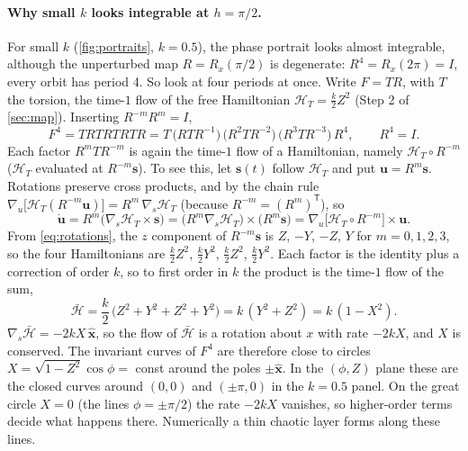 \documentclass[11pt,a4paper]{article}
\newcommand{\vs}{\bm{s}}
\begin{document}
\paragraph{Why small $k$ looks integrable at $h = \pi/2$.} For small $k$ (\cref{fig:portraits}, $k=0.5$), the phase
portrait looks almost integrable, although the unperturbed map $R = R_x(\pi/2)$ is degenerate: $R^4 = R_x(2\pi) = I$,
every orbit has period 4. So look at four periods at once. Write $F = TR$, with $T$ the torsion, the time-$1$ flow of
the free Hamiltonian $\mathcal H_T = \frac k2 Z^2$ (Step 2 of \cref{sec:map}). Inserting $R^{-m}R^m = I$,
\begin{equation*}
  F^4 = TRTRTRTR = T\,\big(RTR^{-1}\big)\,\big(R^2TR^{-2}\big)\,\big(R^3TR^{-3}\big)\,R^4 ,
  \qquad R^4 = I .
\end{equation*}
Each factor $R^mTR^{-m}$ is again the time-$1$ flow of a Hamiltonian, namely $\mathcal H_T\circ R^{-m}$ ($\mathcal H_T$ evaluated at
$R^{-m}\vs$). To see this, let $\vs(t)$ follow $\mathcal H_T$ and put $\bm u = R^m\vs$. Rotations preserve cross products, and by
the chain rule $\nabla_{\!u}\big[\mathcal H_T(R^{-m}\bm u)\big] = R^m\,\nabla_{\!s}\mathcal H_T$ (because $R^{-m} = (R^m)^{\mathsf T}$),
so
\begin{equation*}
  \dot{\bm u} = R^m\big(\nabla_{\!s}\mathcal H_T\times\vs\big) = \big(R^m\nabla_{\!s}\mathcal H_T\big)\times\big(R^m\vs\big)
  = \nabla_{\!u}\big[\mathcal H_T\circ R^{-m}\big]\times\bm u .
\end{equation*}
From \eqref{eq:rotations}, the $z$ component of $R^{-m}\vs$ is $Z$, $-Y$, $-Z$, $Y$ for $m = 0, 1, 2, 3$, so the four
Hamiltonians are $\frac k2 Z^2$, $\frac k2Y^2$, $\frac k2 Z^2$, $\frac k2Y^2$. Each factor is the identity plus a
correction of order $k$, so to first order in $k$ the product is the time-$1$ flow of the sum,
\begin{equation}\label{eq:hbar}
  \bar{\mathcal H} = \frac{k}{2}\,\big(Z^2 + Y^2 + Z^2 + Y^2\big) = k\,(Y^2 + Z^2) = k\,(1 - X^2).
\end{equation}
$\nabla_{\!s}\bar{\mathcal H} = -2kX\,\hat{\bm x}$, so the flow of $\bar{\mathcal H}$ is a rotation about $x$ with rate $-2kX$, and $X$ is
conserved. The invariant curves of $F^4$ are therefore close to circles $X = \sqrt{1-Z^2}\cos\phi = $ const around the
poles $\pm\hat{\bm x}$. In the $(\phi,Z)$ plane these are the closed curves around $(0, 0)$ and $(\pm\pi, 0)$ in the $k=0.5$
panel. On the great circle $X = 0$ (the lines $\phi = \pm\pi/2$) the rate $-2kX$ vanishes, so higher-order terms
decide what happens there. Numerically a thin chaotic layer forms along these lines.
\end{document}
